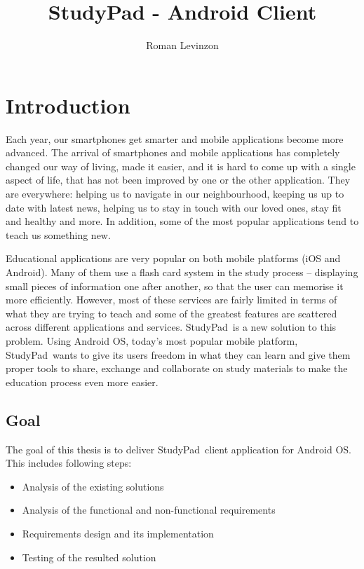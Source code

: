 \documentclass[thesis=B,english]{FITthesis}[2012/10/20]
\title{StudyPad - Android Client}
\author{Roman Levinzon} %
\newcommand{\appname}{StudyPad}
\begin{document}

\chapter{Introduction}

Each year, our smartphones get smarter and mobile applications become more advanced. The arrival of smartphones and mobile applications has completely changed our way of living, made it easier, and it is hard to come up with a single aspect of life, that has not been improved by one or the other application. They are everywhere: helping us to navigate in our neighbourhood, keeping us up to date with latest news, helping us to stay in touch with our loved ones, stay fit and healthy and more. In addition, some of the most popular applications tend to teach us something new.

Educational applications are very popular on both mobile platforms (iOS and Android). Many of them use a flash card system in the study process -- displaying small pieces of information one after another, so that the user can memorise it more efficiently. However, most of these services are fairly limited in terms of what they are trying to teach and some of the greatest  features are scattered across different applications and services. \appname\ is a new solution to this problem. Using Android OS, today's most popular mobile platform, \appname\ wants to give its users freedom in what they can learn and give them proper tools to share, exchange and collaborate on study materials to make the education process even more easier.

\section{Goal}
The goal of this thesis is to deliver  \appname\ client application for  Android OS. This includes following steps:
\begin{itemize}
	\item Analysis of  the existing solutions 
	\item Analysis of the functional and non-functional requirements 
	\item Requirements design and its implementation 
	\item Testing of the resulted solution
\end{itemize}
\end{document}
